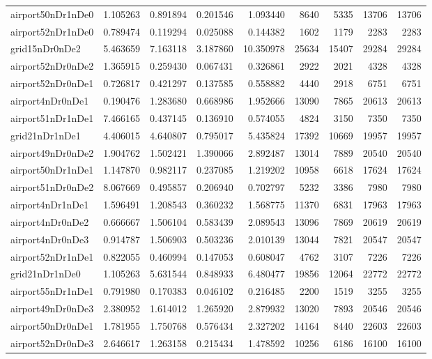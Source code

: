 \begin{longtable}{|l|r|r|r|r|r|r|r|r|}
airport50nDr1nDe0 & 1.105263 & 0.891894 & 0.201546 & 1.093440 & 8640 & 5335 & 13706 & 13706 \\
airport52nDr1nDe0 & 0.789474 & 0.119294 & 0.025088 & 0.144382 & 1602 & 1179 & 2283 & 2283 \\
grid15nDr0nDe2 & 5.463659 & 7.163118 & 3.187860 & 10.350978 & 25634 & 15407 & 29284 & 29284 \\
airport52nDr0nDe2 & 1.365915 & 0.259430 & 0.067431 & 0.326861 & 2922 & 2021 & 4328 & 4328 \\
airport52nDr0nDe1 & 0.726817 & 0.421297 & 0.137585 & 0.558882 & 4440 & 2918 & 6751 & 6751 \\
airport4nDr0nDe1 & 0.190476 & 1.283680 & 0.668986 & 1.952666 & 13090 & 7865 & 20613 & 20613 \\
airport51nDr1nDe1 & 7.466165 & 0.437145 & 0.136910 & 0.574055 & 4824 & 3150 & 7350 & 7350 \\
grid21nDr1nDe1 & 4.406015 & 4.640807 & 0.795017 & 5.435824 & 17392 & 10669 & 19957 & 19957 \\
airport49nDr0nDe2 & 1.904762 & 1.502421 & 1.390066 & 2.892487 & 13014 & 7889 & 20540 & 20540 \\
airport50nDr1nDe1 & 1.147870 & 0.982117 & 0.237085 & 1.219202 & 10958 & 6618 & 17624 & 17624 \\
airport51nDr0nDe2 & 8.067669 & 0.495857 & 0.206940 & 0.702797 & 5232 & 3386 & 7980 & 7980 \\
airport4nDr1nDe1 & 1.596491 & 1.208543 & 0.360232 & 1.568775 & 11370 & 6831 & 17963 & 17963 \\
airport4nDr0nDe2 & 0.666667 & 1.506104 & 0.583439 & 2.089543 & 13096 & 7869 & 20619 & 20619 \\
airport4nDr0nDe3 & 0.914787 & 1.506903 & 0.503236 & 2.010139 & 13044 & 7821 & 20547 & 20547 \\
airport52nDr1nDe1 & 0.822055 & 0.460994 & 0.147053 & 0.608047 & 4762 & 3107 & 7226 & 7226 \\
grid21nDr1nDe0 & 1.105263 & 5.631544 & 0.848933 & 6.480477 & 19856 & 12064 & 22772 & 22772 \\
airport55nDr1nDe1 & 0.791980 & 0.170383 & 0.046102 & 0.216485 & 2200 & 1519 & 3255 & 3255 \\
airport49nDr0nDe3 & 2.380952 & 1.614012 & 1.265920 & 2.879932 & 13020 & 7893 & 20546 & 20546 \\
airport50nDr0nDe1 & 1.781955 & 1.750768 & 0.576434 & 2.327202 & 14164 & 8440 & 22603 & 22603 \\
airport52nDr0nDe3 & 2.646617 & 1.263158 & 0.215434 & 1.478592 & 10256 & 6186 & 16100 & 16100 \\

\end{longtable}
